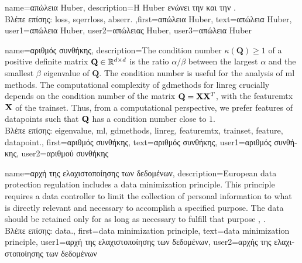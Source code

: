 {name={\foreignlanguage{greek}{απώλεια} Huber}, 
	description={\foreignlanguage{greek}{Η} 
		 Huber \foreignlanguage{greek}{ενώνει την}  \foreignlanguage{greek}{και την} .\\
		\foreignlanguage{greek}{Βλέπε επίσης:} \gls{loss}, \gls{sqerrloss}, \gls{abserr}.
		},first={\foreignlanguage{greek}{απώλεια} Huber},
		text={\foreignlanguage{greek}{απώλεια} Huber},
		user1={\foreignlanguage{greek}{απώλεια} Huber}, %
		user2={\foreignlanguage{greek}{απώλειας} Huber}, %
		user3={\foreignlanguage{greek}{απώλεια} Huber} %
}

{name={\foreignlanguage{greek}{αριθμός συνθήκης}},
	description={The condition number $\kappa(\mathbf{Q}) \geq 1$ of a 
		positive definite 
		matrix $\mathbf{Q} \in \mathbb{R}^{d \times d}$ is the ratio 
		$\alpha /\beta  $ between the 
		largest $\alpha$ and the smallest $\beta$ \gls{eigenvalue} of 
		$\mathbf{Q}$. The condition number is useful for the analysis of \gls{ml} methods. 
		The computational complexity of \gls{gdmethods} for \gls{linreg} crucially depends on the 
		condition number of the matrix $\mathbf{Q} = {\bf X} {\bf X}^{T}$, with the \gls{featuremtx} ${\bf X}$ 
		of the \gls{trainset}. Thus, from a computational perspective, we prefer \gls{feature}s of 
		\gls{datapoint}s such that $\mathbf{Q}$ has a condition number close to $1$.\\
		\foreignlanguage{greek}{Βλέπε επίσης:} \gls{eigenvalue}, \gls{ml}, \gls{gdmethods}, \gls{linreg}, \gls{featuremtx}, \gls{trainset}, \gls{feature}, \gls{datapoint}.},
		first={\foreignlanguage{greek}{αριθμός συνθήκης}},
		text={\foreignlanguage{greek}{αριθμός συνθήκης}},
		user1={\foreignlanguage{greek}{αριθμός συνθήκης}}, %
		user2={\foreignlanguage{greek}{αριθμού συνθήκης}} %
}

{name={\foreignlanguage{greek}{αρχή της ελαχιστοποίησης των δεδομένων}},
	description={European \gls{data} protection regulation 
		includes a \gls{data} minimization principle. This principle requires a \gls{data} controller to 
		limit the collection of personal information to what is directly relevant and necessary 
		to accomplish a specified purpose. The \gls{data} should be retained only for as long as 
		necessary to fulfill that purpose \cite[Article 5(1)(c)]{GDPR2016}, \cite{EURegulation2018}.\\
		\foreignlanguage{greek}{Βλέπε επίσης:} \gls{data}.}, 
	first={data minimization principle},
	text={data minimization principle},
	user1={\foreignlanguage{greek}{αρχή της ελαχιστοποίησης των δεδομένων}}, %
  	user2={\foreignlanguage{greek}{αρχής της ελαχιστοποίησης των δεδομένων}} %
}

